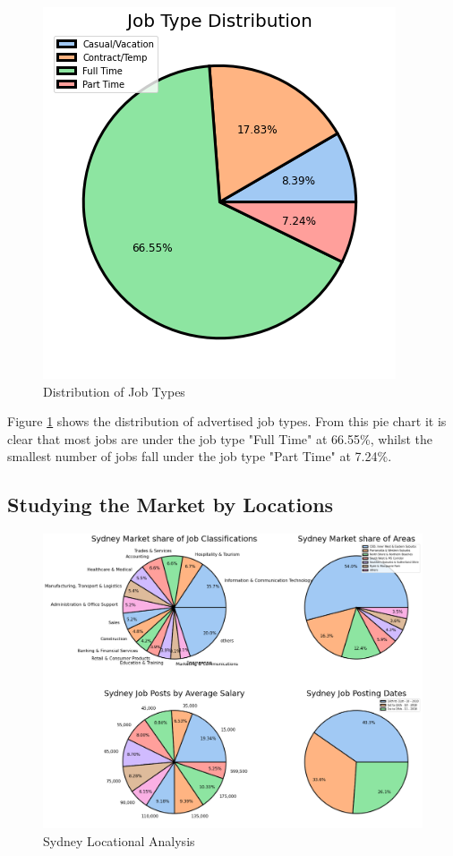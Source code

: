\documentclass[twoside, 12pt, a4paper]{article}
\begin{document}
\begin{figure}[h]
	\centering
	\includegraphics[scale = 0.55]{JobType.png}
	\caption{Distribution of Job Types}
	\label{fig:JobTypes}
\end{figure}

Figure \ref{fig:JobTypes} shows the distribution of advertised job types. From this pie chart it is clear that most jobs are under the job type "Full Time" at 66.55\%, whilst the smallest number of jobs fall under the job type "Part Time" at 7.24\%. 

\newpage
\subsection{Studying the Market by Locations}

\begin{figure}[h!]
	\centering
	\includegraphics[scale = 0.26]{SydneyLocational.png}
	\caption{Sydney Locational Analysis}
	\label{fig:SydneyLoc}
\end{figure}
\end{document}
